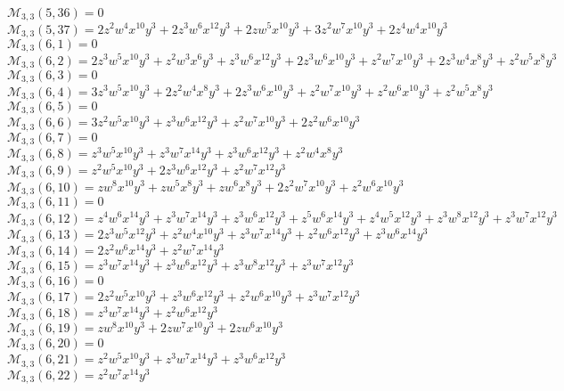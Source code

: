 $\mathcal{M}_{3,3}(5,36)=0$\\
$\mathcal{M}_{3,3}(5,37)=2z^2w^4x^{10}y^3+2z^3w^6x^{12}y^3+2zw^5x^{10}y^3+3z^2w^7x^{10}y^3+2z^4w^4x^{10}y^3$\\
$\mathcal{M}_{3,3}(6,1)=0$\\
$\mathcal{M}_{3,3}(6,2)=2z^3w^5x^{10}y^3+z^2w^3x^6y^3+z^3w^6x^{12}y^3+2z^3w^6x^{10}y^3+z^2w^7x^{10}y^3+2z^3w^4x^8y^3+z^2w^5x^8y^3$\\
$\mathcal{M}_{3,3}(6,3)=0$\\
$\mathcal{M}_{3,3}(6,4)=3z^3w^5x^{10}y^3+2z^2w^4x^8y^3+2z^3w^6x^{10}y^3+z^2w^7x^{10}y^3+z^2w^6x^{10}y^3+z^2w^5x^8y^3$\\
$\mathcal{M}_{3,3}(6,5)=0$\\
$\mathcal{M}_{3,3}(6,6)=3z^2w^5x^{10}y^3+z^3w^6x^{12}y^3+z^2w^7x^{10}y^3+2z^2w^6x^{10}y^3$\\
$\mathcal{M}_{3,3}(6,7)=0$\\
$\mathcal{M}_{3,3}(6,8)=z^3w^5x^{10}y^3+z^3w^7x^{14}y^3+z^3w^6x^{12}y^3+z^2w^4x^8y^3$\\
$\mathcal{M}_{3,3}(6,9)=z^2w^5x^{10}y^3+2z^3w^6x^{12}y^3+z^2w^7x^{12}y^3$\\
$\mathcal{M}_{3,3}(6,10)=zw^8x^{10}y^3+zw^5x^8y^3+zw^6x^8y^3+2z^2w^7x^{10}y^3+z^2w^6x^{10}y^3$\\
$\mathcal{M}_{3,3}(6,11)=0$\\
$\mathcal{M}_{3,3}(6,12)=z^4w^6x^{14}y^3+z^3w^7x^{14}y^3+z^3w^6x^{12}y^3+z^5w^6x^{14}y^3+z^4w^5x^{12}y^3+z^3w^8x^{12}y^3+z^3w^7x^{12}y^3$\\
$\mathcal{M}_{3,3}(6,13)=2z^3w^5x^{12}y^3+z^2w^4x^{10}y^3+z^3w^7x^{14}y^3+z^2w^6x^{12}y^3+z^3w^6x^{14}y^3$\\
$\mathcal{M}_{3,3}(6,14)=2z^2w^6x^{14}y^3+z^2w^7x^{14}y^3$\\
$\mathcal{M}_{3,3}(6,15)=z^3w^7x^{14}y^3+z^3w^6x^{12}y^3+z^3w^8x^{12}y^3+z^3w^7x^{12}y^3$\\
$\mathcal{M}_{3,3}(6,16)=0$\\
$\mathcal{M}_{3,3}(6,17)=2z^2w^5x^{10}y^3+z^3w^6x^{12}y^3+z^2w^6x^{10}y^3+z^3w^7x^{12}y^3$\\
$\mathcal{M}_{3,3}(6,18)=z^3w^7x^{14}y^3+z^2w^6x^{12}y^3$\\
$\mathcal{M}_{3,3}(6,19)=zw^8x^{10}y^3+2zw^7x^{10}y^3+2zw^6x^{10}y^3$\\
$\mathcal{M}_{3,3}(6,20)=0$\\
$\mathcal{M}_{3,3}(6,21)=z^2w^5x^{10}y^3+z^3w^7x^{14}y^3+z^3w^6x^{12}y^3$\\
$\mathcal{M}_{3,3}(6,22)=z^2w^7x^{14}y^3$\\
